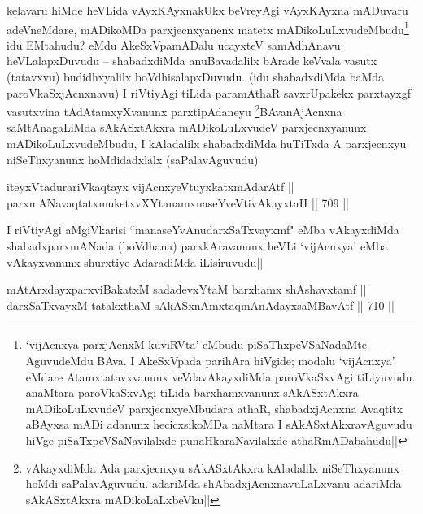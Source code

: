 \begin{artha} 
kelavaru hiMde heVLida vAyxKAyxnakUkx beVreyAgi vAyxKAyxna mADuvaru 
adeVneMdare, mADikoMDa parxjecnxyanenx matetx 
mADikoLuLxvudeMbudu\footnote[1]{`vijAcnxya parxjAcnxM kuviRVta' eMbudu 
piSaThxpeVSaNadaMte AguvudeMdu BAva. I AkeSxVpada parihAra hiVgide; 
modalu `vijAcnxya' eMdare Atamxtatavxvanunx veVdavAkayxdiMda 
paroVkaSxvAgi tiLiyuvudu. anaMtara paroVkaSxvAgi tiLida barxhamxvanunx 
sAkASxtAkxra mADikoLuLxvudeV parxjecnxyeMbudara athaR, shabadxjAcnxna 
Avaqtitx aBAyxsa mADi adanunx hecicxsikoMDa naMtara I 
sAkASxtAkxravAguvudu hiVge piSaTxpeVSaNavilalxde punaHkaraNavilalxde 
athaRmADabahudu||} idu EMtahudu? eMdu AkeSxVpamADalu 
ucayxteV samAdhAnavu heVLalapxDuvudu -- shabadxdiMda anuBavadalilx 
bArade keVvala vasutx (tatavxvu) budidhxyalilx boVdhisalapxDuvudu. 
(idu shabadxdiMda baMda paroVkaSxjAcnxnavu) I riVtiyAgi tiLida 
paramAthaR savxrUpakekx parxtayxgf vasutxvina tAdAtamxyXvanunx 
parxtipAdaneyu \footnote[2]{vAkayxdiMda Ada parxjecnxyu sAkASxtAkxra 
kAladalilx niSeThxyanunx hoMdi saPalavAguvudu. adariMda 
shAbadxjAcnxnavuLaLxvanu adariMda sAkASxtAkxra mADikoLaLxbeVku||}BAvanAjAcnxna saMtAnagaLiMda sAkASxtAkxra 
mADikoLuLxvudeV parxjecnxyanunx mADikoLuLxvudeMbudu, I kAladalilx 
shabadxdiMda huTiTxda A parxjecnxyu niSeThxyanunx hoMdidadxlalx 
(saPalavAguvudu) 
\end{artha}

\begin{shl}
iteyxVtadurariVkaqtayx vijAcnxyeVtuyxkatxmAdarAtf || \\
parxmANavaqtatxmuketxvXYtanamxnaseYveVtivAkayxtaH ||  709 ||  
\end{shl}

\begin{artha} 
I riVtiyAgi aMgiVkarisi ``manaseYvAnudarxSaTxvayxmf" eMba vAkayxdiMda 
shabadxparxmANada (boVdhana) parxkAravanunx heVLi `vijAcnxya' eMba 
vAkayxvanunx shurxtiye AdaradiMda iLisiruvudu||
\end{artha}


\begin{shl}
mAtArxdayxparxviBakatxM sadadevxYtaM barxhamx shAshavxtamf || \\
darxSaTxvayxM tatakxthaM sAkASxnAmxtaqmAnAdayxsaMBavAtf ||  710 ||  
\end{shl}


